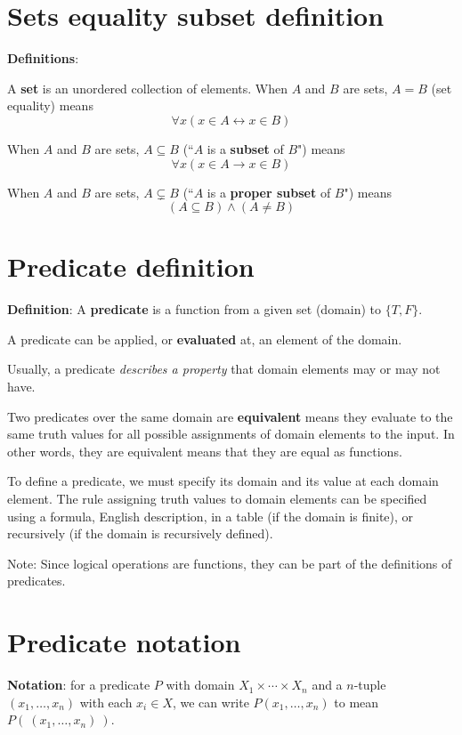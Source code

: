 \documentclass[12pt, oneside]{article}
\begin{document}
\begin{flushright}
\end{flushright} \section*{Sets equality subset definition}


{\bf Definitions}:

A {\bf set} is an  unordered collection of  elements.
When $A$ and  $B$ are sets,  $A = B$ (set equality) means  
\[
    \forall x  ( x\in A \leftrightarrow x \in B)
\]

When $A$ and  $B$ are sets, $A \subseteq B$ (``$A$ is a {\bf subset} of $B$") means 
\[
    \forall x  (x \in A  \to x  \in B)
\]

When $A$ and  $B$ are sets,  $A \subsetneq B$ (``$A$ is a {\bf proper subset} of $B$") means 
\[
    (A\subseteq B) \wedge  (A \neq B)
\] \vfill
\section*{Predicate definition}


{\bf  Definition}: A  {\bf predicate}  is  a function from a given set (domain) to $\{T,F\}$.

A predicate can be applied, or {\bf evaluated} at, an element of the domain.

Usually, a predicate {\it describes a  property} that domain elements may or may not have.

Two predicates over the same domain are {\bf equivalent} means they evaluate to
the same truth values for all possible assignments of domain elements to the
input. In other words, they are equivalent means that they are equal as functions.

To define a predicate, we must specify its domain and its value at each domain element.
The rule assigning truth values to domain elements can be specified using a formula, 
English description, in a table (if the domain is finite), or recursively (if the domain is recursively
defined).

Note: Since logical operations are functions, they can be part of the definitions of predicates. \vfill
\section*{Predicate notation}


{\bf Notation}: for a predicate $P$ with domain $X_1 \times \cdots \times X_n$ and a 
$n$-tuple $(x_1, \ldots, x_n)$ 
with each $x_i \in X$, we 
can write $P(x_1, \ldots, x_n)$ to mean $P( ~(x_1, \ldots, x_n)~)$.
 \vfill
\end{document}
